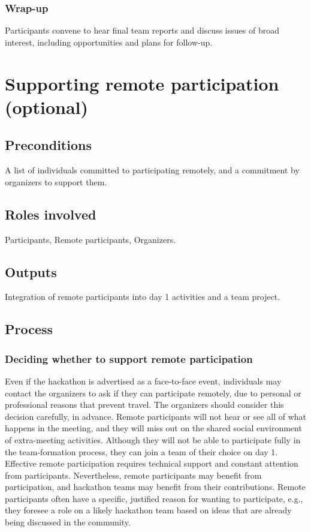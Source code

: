 \documentclass[letterpaper,11pt]{texMemo}
\begin{document}
\subsubsection*{Wrap-up} Participants convene to hear final team reports and discuss issues of broad interest, including opportunities and plans for follow-up.  

\newpage
\section{Supporting remote participation (optional)}
\subsection{Preconditions}
A list of individuals committed to participating remotely, and a commitment by organizers to support them. 
\subsection{Roles involved}
Participants, Remote participants, Organizers. 
\subsection{Outputs}
Integration of remote participants into day 1 activities and a team project.  
\subsection{Process}
\subsubsection*{Deciding whether to support remote participation} Even if the hackathon is advertised as a face-to-face event, individuals may contact the organizers to ask if they can participate remotely, due to personal or professional reasons that prevent travel.  The organizers should consider this decision carefully, in advance. Remote participants will not hear or see all of what happens in the meeting, and they will miss out on the shared social environment of extra-meeting activities. Although they will not be able to participate fully in the team-formation process, they can join a team of their choice on day 1. Effective remote participation requires technical support and constant attention from participants. Nevertheless, remote participants may benefit from participation, and hackathon teams may benefit from their contributions. Remote participants often have a specific, justified reason for wanting to participate, e.g., they foresee a role on a likely hackathon team based on ideas that are already being discussed in the community.  
\end{document}
